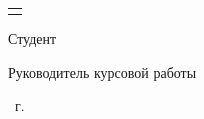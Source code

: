 \begin{titlepage}
\begin{center}
\begin{tabularx}{\linewidth}{@{}X@{}}
{                \hfill}
        \end{tabularx}

        \vfill

        \begin{flushleft}
            {Студент } \hfill
            
            \vspace{1.0cm}

            {Руководитель курсовой работы} \hfill

            \vspace{1.0cm}
        \end{flushleft}

        \the\year\ г.

    \end{center}
\end{titlepage}

